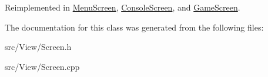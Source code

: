 Reimplemented in \hyperlink{classMenuScreen_a8a96f9e8ec773604623cee9f28981908}{Menu\+Screen}, \hyperlink{classConsoleScreen_a512a1401ec957d5d2d504aafd315362d}{Console\+Screen}, and \hyperlink{classGameScreen_a1f82a990e5a99b6277d61a241f7ee249}{Game\+Screen}.



The documentation for this class was generated from the following files\+:\begin{DoxyCompactItemize}
\item 
src/\+View/Screen.\+h\item 
src/\+View/Screen.\+cpp\end{DoxyCompactItemize}
